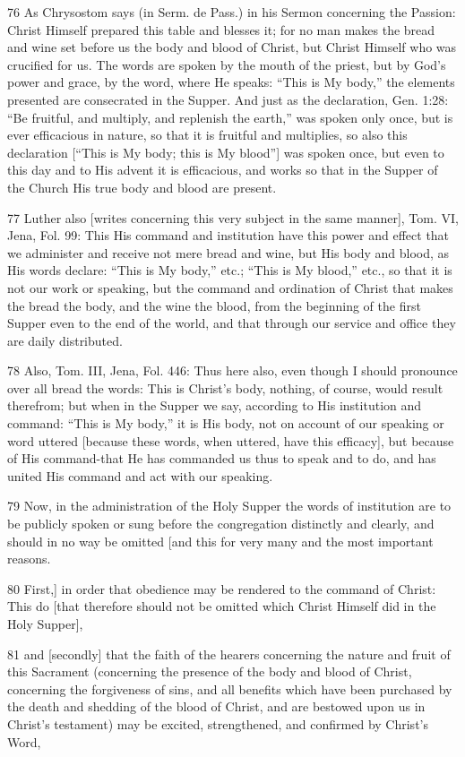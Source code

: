 76 As Chrysostom says (in Serm. de Pass.) in his Sermon concerning the Passion: Christ Himself prepared this table and blesses it; for no man makes the bread and wine set before us the body and blood of Christ, but Christ Himself who was crucified for us. The words are spoken by the mouth of the priest, but by God’s power and grace, by the word, where He speaks: “This is My body,” the elements presented are consecrated in the Supper. And just as the declaration, Gen. 1:28: “Be fruitful, and multiply, and replenish the earth,” was spoken only once, but is ever efficacious in nature, so that it is fruitful and multiplies, so also this declaration [“This is My body; this is My blood”] was spoken once, but even to this day and to His advent it is efficacious, and works so that in the Supper of the Church His true body and blood are present.

77 Luther also [writes concerning this very subject in the same manner], Tom. VI, Jena, Fol. 99: This His command and institution have this power and effect that we administer and receive not mere bread and wine, but His body and blood, as His words declare: “This is My body,” etc.; “This is My blood,” etc., so that it is not our work or speaking, but the command and ordination of Christ that makes the bread the body, and the wine the blood, from the beginning of the first Supper even to the end of the world, and that through our service and office they are daily distributed.

78 Also, Tom. III, Jena, Fol. 446: Thus here also, even though I should pronounce over all bread the words: This is Christ’s body, nothing, of course, would result therefrom; but when in the Supper we say, according to His institution and command: “This is My body,” it is His body, not on account of our speaking or word uttered [because these words, when uttered, have this efficacy], but because of His command-that He has commanded us thus to speak and to do, and has united His command and act with our speaking.

79 Now, in the administration of the Holy Supper the words of institution are to be publicly spoken or sung before the congregation distinctly and clearly, and should in no way be omitted [and this for very many and the most important reasons.

80 First,] in order that obedience may be rendered to the command of Christ: This do [that therefore should not be omitted which Christ Himself did in the Holy Supper],

81 and [secondly] that the faith of the hearers concerning the nature and fruit of this Sacrament (concerning the presence of the body and blood of Christ, concerning the forgiveness of sins, and all benefits which have been purchased by the death and shedding of the blood of Christ, and are bestowed upon us in Christ’s testament) may be excited, strengthened, and confirmed by Christ’s Word,

